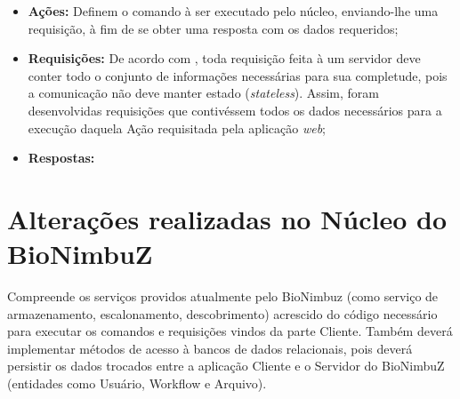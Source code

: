 \begin{itemize}
	\item \textbf{Ações:} Definem o comando à ser executado pelo núcleo, enviando-lhe uma requisição, à fim de se obter uma resposta com os dados requeridos;
	\item \textbf{Requisições:} De acordo com \cite{rest}, toda requisição feita à um servidor deve conter todo o conjunto de informações necessárias para sua completude, pois a comunicação não deve manter estado (\textit{stateless}). Assim, foram desenvolvidas requisições que contivéssem todos os dados necessários para a execução daquela Ação requisitada pela aplicação \textit{web};
	\item \textbf{Respostas:}
\end{itemize}


\section{Alterações realizadas no Núcleo do BioNimbuZ} \label{cap5sec5}
    
Compreende os serviços providos atualmente pelo BioNimbuz (como serviço de armazenamento, escalonamento, descobrimento) acrescido do código necessário para executar os comandos e requisições vindos da parte Cliente. Também deverá implementar métodos de acesso à bancos de dados relacionais, pois deverá persistir os dados trocados entre a aplicação Cliente e o Servidor do BioNimbuZ (entidades como Usuário, Workflow e Arquivo).

%




